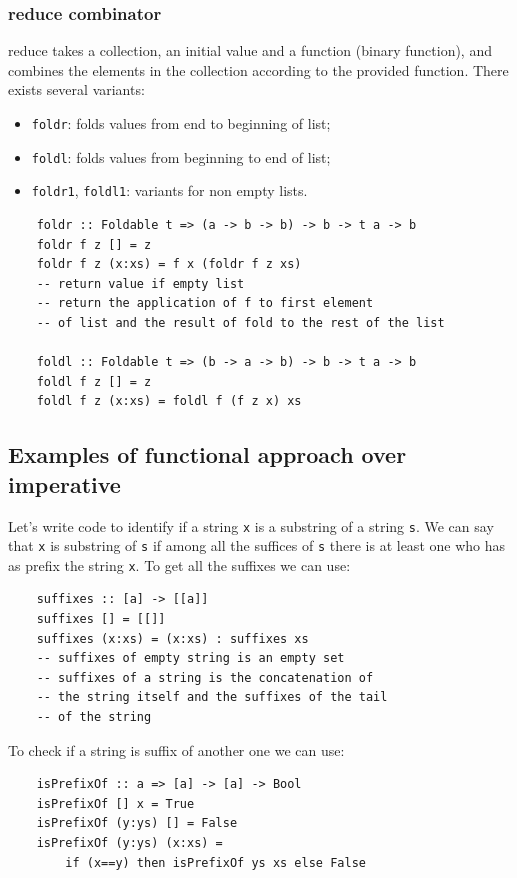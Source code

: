\subsubsection{reduce combinator}
reduce takes a collection, an initial value and a function (binary function), and combines the elements in the collection according to the provided function.
There exists several variants:
\begin{itemize}
    \item \verb|foldr|: folds values from end to beginning of list;
    \item \verb|foldl|: folds values from beginning to end of list;
    \item \verb|foldr1|, \verb|foldl1|: variants for non empty lists.
\end{itemize}
\begin{verbatim}
    foldr :: Foldable t => (a -> b -> b) -> b -> t a -> b
    foldr f z [] = z
    foldr f z (x:xs) = f x (foldr f z xs)
    -- return value if empty list
    -- return the application of f to first element
    -- of list and the result of fold to the rest of the list

    foldl :: Foldable t => (b -> a -> b) -> b -> t a -> b
    foldl f z [] = z
    foldl f z (x:xs) = foldl f (f z x) xs      
\end{verbatim}

\subsection{Examples of functional approach over imperative}
Let's write code to identify if a string \verb|x| is a substring of a string \verb|s|.
We can say that \verb|x| is substring of \verb|s| if among all the suffices of \verb|s| there is at least one who has as prefix the string \verb|x|.
To get all the suffixes we can use:
\begin{verbatim}
    suffixes :: [a] -> [[a]]
    suffixes [] = [[]]
    suffixes (x:xs) = (x:xs) : suffixes xs
    -- suffixes of empty string is an empty set
    -- suffixes of a string is the concatenation of
    -- the string itself and the suffixes of the tail
    -- of the string
\end{verbatim}

To check if a string is suffix of another one we can use:
\begin{verbatim}
    isPrefixOf :: a => [a] -> [a] -> Bool
    isPrefixOf [] x = True
    isPrefixOf (y:ys) [] = False
    isPrefixOf (y:ys) (x:xs) = 
        if (x==y) then isPrefixOf ys xs else False
\end{verbatim}

